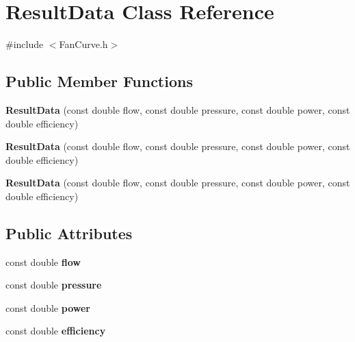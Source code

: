 \hypertarget{class_result_data}{}\section{Result\+Data Class Reference}
\label{class_result_data}


{\ttfamily \#include $<$Fan\+Curve.\+h$>$}

\subsection*{Public Member Functions}
\begin{DoxyCompactItemize}
\item 
\mbox{\label{class_result_data_ab10ba8e317d8b9d830c5f90debfbb15b}} 
{\bfseries Result\+Data} (const double flow, const double pressure, const double power, const double efficiency)
\item 
\mbox{\label{class_result_data_ab10ba8e317d8b9d830c5f90debfbb15b}} 
{\bfseries Result\+Data} (const double flow, const double pressure, const double power, const double efficiency)
\item 
\mbox{\label{class_result_data_ab10ba8e317d8b9d830c5f90debfbb15b}} 
{\bfseries Result\+Data} (const double flow, const double pressure, const double power, const double efficiency)
\end{DoxyCompactItemize}
\subsection*{Public Attributes}
\begin{DoxyCompactItemize}
\item 
\mbox{\label{class_result_data_ae8459ee960a807938dfe6eaa265531cc}} 
const double {\bfseries flow}
\item 
\mbox{\label{class_result_data_a496cd3f0c80f254fcf2ebd7f3476e6dd}} 
const double {\bfseries pressure}
\item 
\mbox{\label{class_result_data_a990344826f779c300db9e3128f160c1e}} 
const double {\bfseries power}
\item 
\mbox{\label{class_result_data_a1b75ddc30c8470877bc93bfa6ccafa0e}} 
const double {\bfseries efficiency}
\end{DoxyCompactItemize}


